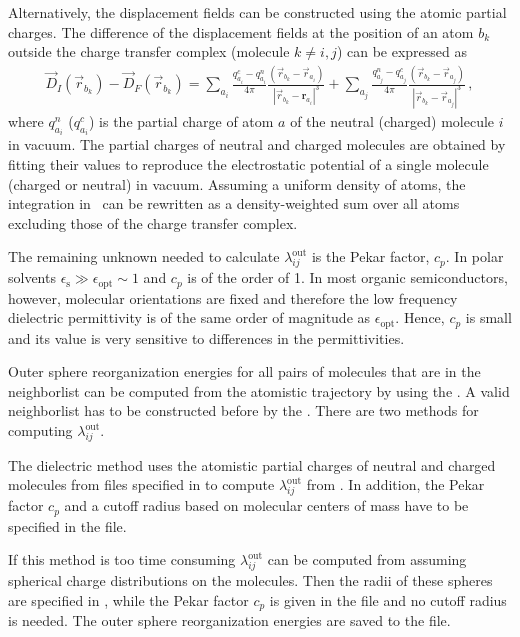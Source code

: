 Alternatively, the displacement fields can be constructed using the atomic partial charges. The difference of the displacement fields at the position of an atom $b_k$ outside the charge transfer complex (molecule $k \ne i,j$)  can be expressed as
\begin{eqnarray}
\label{equ:disp_atom}
\vec{D}_I(\vec{r}_{b_k}) - \vec{D}_F(\vec{r}_{b_k})  = 
\sum_{a_i} \frac{q_{a_i}^c - q_{a_i}^n}{4\pi } \frac{ (\vec{r}_{b_k} - \vec{r}_{a_i} ) }
                                            {|\vec{r}_{b_k}-\bm{r}_{a_i}|^3}+
\sum_{a_j} \frac{q_{a_j}^n - q_{a_j}^c}{4\pi } \frac{ (\vec{r}_{b_k}-\vec{r}_{a_j} ) } 
                                            {|\vec{r}_{b_k}-\vec{r}_{a_j}|^3}\,,
\end{eqnarray}
where $q^n_{a_i}$ ($q^c_{a_i}$) is the partial charge of atom $a$ of the neutral (charged) molecule $i$ in vacuum. The partial charges of neutral and charged molecules are obtained by fitting their values to reproduce the electrostatic potential of a single molecule (charged or neutral) in vacuum. 
%
Assuming a uniform density of atoms, the integration in~ can be rewritten as a density-weighted sum over all atoms excluding those of the charge transfer complex.

The remaining unknown needed to calculate $\lambda_{ij}^\text{out}$ is the Pekar factor, $c_p$. In polar solvents $\epsilon_\text{s}\gg\epsilon_\text{opt}\sim 1$ and $c_p$ is of the order of 1. In most organic semiconductors, however, molecular orientations are fixed and therefore the low frequency dielectric permittivity is of the same order of magnitude as $\epsilon_\text{opt}$. Hence, $c_p$ is small and its value is very sensitive to differences in the permittivities. 


Outer sphere reorganization energies for all pairs of molecules that are in the neighborlist can be computed from the atomistic trajectory by using the  \calculator. A valid neighborlist has to be constructed before by the  \calculator. There are two methods for computing $\lambda_{ij}^\text{out}$.

The dielectric method uses the atomistic partial charges of neutral and charged molecules from files specified in \xmlsegments to compute $\lambda_{ij}^\text{out}$ from . In addition, the Pekar factor $c_p$ and a cutoff radius  based on molecular centers of mass have to be specified in the \xmloptions file. 

If this method is too time consuming $\lambda_{ij}^\text{out}$ can be computed from  assuming spherical charge distributions on the molecules. Then the radii of these spheres are specified in \xmlsegments, while the Pekar factor $c_p$ is given in the \xmloptions file and no cutoff radius is needed.
The outer sphere reorganization energies are saved to the \sqlstate file.

{\small \ctprun \opt \xmloptions  \seg  \xmlsegments \sql  \sqlstate \exe  {}}
